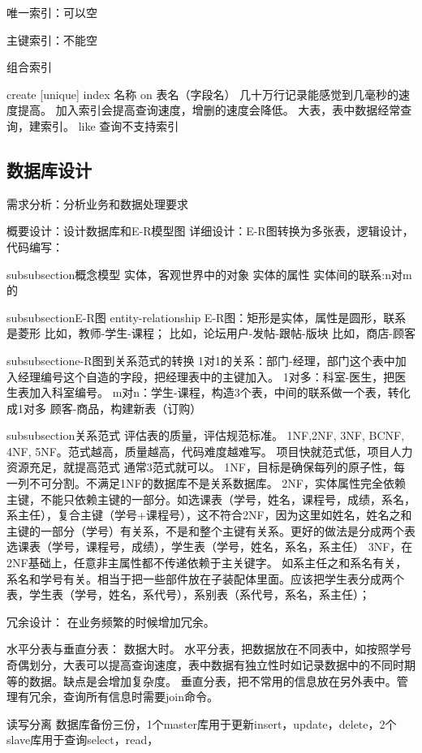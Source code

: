 \documentclass[UTF8]{article}
\begin{document}
唯一索引：可以空
 
主键索引：不能空

组合索引

create [unique] index 名称 on 表名（字段名）
几十万行记录能感觉到几毫秒的速度提高。
加入索引会提高查询速度，增删的速度会降低。
大表，表中数据经常查询，建索引。
like 查询不支持索引


\subsection{数据库设计}
需求分析：分析业务和数据处理要求

概要设计：设计数据库和E-R模型图
详细设计：E-R图转换为多张表，逻辑设计，
代码编写：



subsubsection{概念模型}
实体，客观世界中的对象
实体的属性
实体间的联系:n对m的


subsubsection{E-R图}
entity-relationship
E-R图：矩形是实体，属性是圆形，联系是菱形
比如，教师-学生-课程；
比如，论坛用户-发帖-跟帖-版块
比如，商店-顾客

subsubsection{e-R图到关系范式的转换}
1对1的关系：部门-经理，部门这个表中加入经理编号这个自造的字段，把经理表中的主键加入。
1对多：科室-医生，把医生表加入科室编号。
m对n：学生-课程，构造3个表，中间的联系做一个表，转化成1对多
顾客-商品，构建新表（订购）

subsubsection{关系范式}
评估表的质量，评估规范标准。
1NF,2NF, 3NF, BCNF,  4NF, 5NF。范式越高，质量越高，代码难度越难写。
项目快就范式低，项目人力资源充足，就提高范式
通常3范式就可以。
1NF，目标是确保每列的原子性，每一列不可分割。不满足1NF的数据库不是关系数据库。
2NF，实体属性完全依赖主键，不能只依赖主键的一部分。如选课表（学号，姓名，课程号，成绩，系名，系主任），复合主键（学号+课程号），这不符合2NF，因为这里如姓名，姓名之和主键的一部分（学号）有关系，不是和整个主键有关系。更好的做法是分成两个表选课表（学号，课程号，成绩），学生表（学号，姓名，系名，系主任）
3NF，在2NF基础上，任意非主属性都不传递依赖于主关键字。
如系主任之和系名有关，系名和学号有关。相当于把一些部件放在子装配体里面。应该把学生表分成两个表，学生表（学号，姓名，系代号），系别表（系代号，系名，系主任）；


冗余设计：
在业务频繁的时候增加冗余。

水平分表与垂直分表：
数据大时。
水平分表，把数据放在不同表中，如按照学号奇偶划分，大表可以提高查询速度，表中数据有独立性时如记录数据中的不同时期等的数据。缺点是会增加复杂度。
垂直分表，把不常用的信息放在另外表中。管理有冗余，查询所有信息时需要join命令。

读写分离
数据库备份三份，1个master库用于更新insert，update，delete，2个slave库用于查询select，read，
\end{document}
